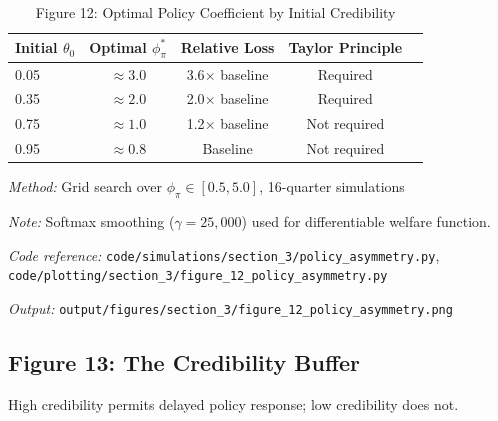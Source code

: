 \documentclass[11pt]{article}
\begin{document}
\begin{table}[htbp]
\centering
\caption{Figure 12: Optimal Policy Coefficient by Initial Credibility}
\label{tab:optimal_policy}
\begin{threeparttable}
\begin{tabular}{lcccc}
\toprule
Initial $\theta_0$ & Optimal $\phi_\pi^*$ & Relative Loss & Taylor Principle \\
\midrule
0.05 & $\approx 3.0$ & 3.6$\times$ baseline & Required \\
0.35 & $\approx 2.0$ & 2.0$\times$ baseline & Required \\
0.75 & $\approx 1.0$ & 1.2$\times$ baseline & Not required \\
0.95 & $\approx 0.8$ & Baseline & Not required \\
\bottomrule
\end{tabular}
\begin{tablenotes}
\small
\item \textit{Method:} Grid search over $\phi_\pi \in [0.5, 5.0]$, 16-quarter simulations
\item \textit{Note:} Softmax smoothing ($\gamma = 25{,}000$) used for differentiable welfare function.
\item \textit{Code reference:} \texttt{code/simulations/section\_3/policy\_asymmetry.py}, \texttt{code/plotting/section\_3/figure\_12\_policy\_asymmetry.py}
\item \textit{Output:} \texttt{output/figures/section\_3/figure\_12\_policy\_asymmetry.png}
\end{tablenotes}
\end{threeparttable}
\end{table}

\subsection{Figure 13: The Credibility Buffer}

High credibility permits delayed policy response; low credibility does not.
\end{document}
